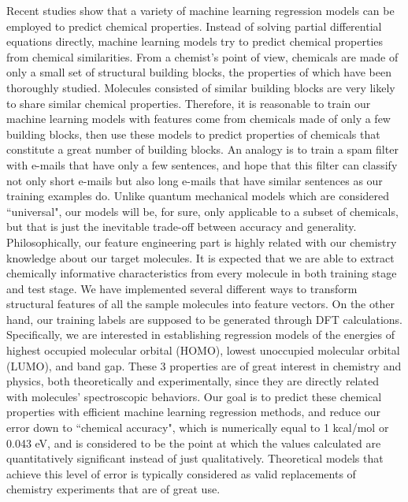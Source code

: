 \documentclass[10pt, oneside]{article}   	%
\begin{document}
Recent studies show that a variety of machine learning regression models can be employed to predict chemical properties. Instead of solving partial differential equations directly, machine learning models try to predict chemical properties from chemical similarities. From a chemist's point of view, chemicals are made of only a small set of structural building blocks, the properties of which have been thoroughly studied. Molecules consisted of similar building blocks are very likely to share similar chemical properties. Therefore, it is reasonable to train our machine learning models with features come from chemicals made of only a few building blocks, then use these models to predict properties of chemicals that constitute a great number of building blocks. An analogy is to train a spam filter with e-mails that have only a few sentences, and hope that this filter can classify not only short e-mails but also long e-mails that have similar sentences as our training examples do. Unlike quantum mechanical models which are considered ``universal", our models will be, for sure, only applicable to a subset of chemicals, but that is just the inevitable trade-off between accuracy and generality. \\

Philosophically, our feature engineering part is highly related with our chemistry knowledge about our target molecules. It is expected that we are able to extract chemically informative characteristics from every molecule in both training stage and test stage. We have implemented several different ways to transform structural features of all the sample molecules into feature vectors. On the other hand, our training labels are supposed to be generated through DFT calculations. Specifically, we are interested in establishing regression models of the energies of highest occupied molecular orbital (HOMO), lowest unoccupied molecular orbital (LUMO), and band gap. These 3 properties are of great interest in chemistry and physics, both theoretically and experimentally, since they are directly related with molecules' spectroscopic behaviors\cite{hc}. Our goal is to predict these chemical properties with efficient machine learning regression methods, and reduce our error down to ``chemical accuracy", which is numerically equal to 1 kcal/mol or 0.043 eV, and is considered to be the point at which the values calculated are quantitatively significant instead of just qualitatively. Theoretical models that achieve this level of error is typically considered as valid replacements of chemistry experiments that are of great use. \\
\end{document}
